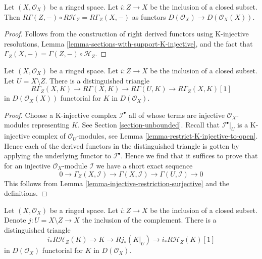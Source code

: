 \begin{lemma}
\label{lemma-local-to-global-sections-with-support}
Let $(X, \mathcal{O}_X)$ be a ringed space. Let $i : Z \to X$ be the
inclusion of a closed subset. Then
$R\Gamma(Z, - ) \circ R\mathcal{H}_Z = R\Gamma_Z(X, - )$
as functors $D(\mathcal{O}_X) \to D(\mathcal{O}_X(X))$.
\end{lemma}

\begin{proof}
Follows from the construction of right derived functors using
K-injective resolutions, Lemma \ref{lemma-sections-with-support-K-injective},
and the fact that $\Gamma_Z(X, -) = \Gamma(Z, -) \circ \mathcal{H}_Z$.
\end{proof}

\begin{lemma}
\label{lemma-triangle-sections-with-support}
Let $(X, \mathcal{O}_X)$ be a ringed space. Let $i : Z \to X$ be the
inclusion of a closed subset. Let $U = X \setminus Z$.
There is a distinguished triangle
$$
R\Gamma_Z(X, K) \to R\Gamma(X, K) \to R\Gamma(U, K) \to
R\Gamma_Z(X, K)[1]
$$
in $D(\mathcal{O}_X(X))$ functorial for $K$ in $D(\mathcal{O}_X)$.
\end{lemma}

\begin{proof}
Choose a K-injective complex $\mathcal{I}^\bullet$ all of whose terms
are injective $\mathcal{O}_X$-modules representing $K$. See
Section \ref{section-unbounded}. Recall that $\mathcal{I}^\bullet|_U$
is a K-injective complex of $\mathcal{O}_U$-modules, see
Lemma \ref{lemma-restrict-K-injective-to-open}. Hence each
of the derived functors in the distinguished triangle is gotten
by applying the underlying functor to $\mathcal{I}^\bullet$.
Hence we find that it suffices to prove that
for an injective $\mathcal{O}_X$-module $\mathcal{I}$ we have
a short exact sequence
$$
0 \to \Gamma_Z(X, \mathcal{I}) \to \Gamma(X, \mathcal{I})
\to \Gamma(U, \mathcal{I}) \to 0
$$
This follows from Lemma \ref{lemma-injective-restriction-surjective}
and the definitions.
\end{proof}

\begin{lemma}
\label{lemma-triangle-sections-with-support-sheaves}
Let $(X, \mathcal{O}_X)$ be a ringed space. Let $i : Z \to X$ be the
inclusion of a closed subset. Denote $j : U = X \setminus Z \to X$
the inclusion of the complement. There is a distinguished triangle
$$
i_*R\mathcal{H}_Z(K) \to K \to Rj_*(K|_U) \to
i_*R\mathcal{H}_Z(K)[1]
$$
in $D(\mathcal{O}_X)$ functorial for $K$ in $D(\mathcal{O}_X)$.
\end{lemma}

